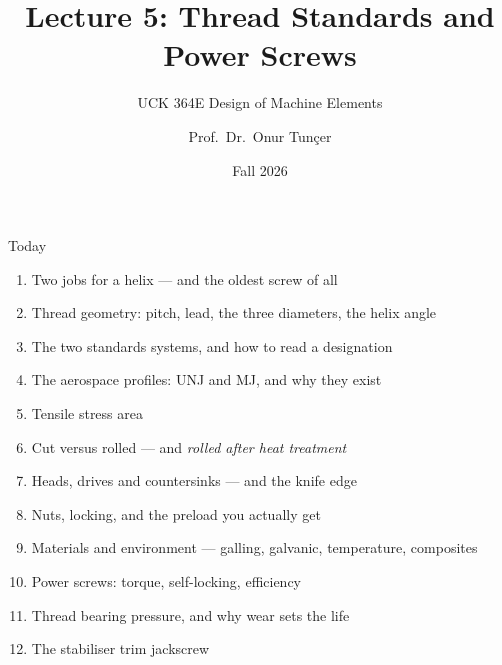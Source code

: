 \documentclass[aspectratio=169,10pt]{beamer}
\title{Lecture 5: Thread Standards and Power Screws}
\subtitle{UCK 364E Design of Machine Elements}
\author{Prof.\ Dr.\ Onur Tunçer}
\institute{Department of Aeronautical Engineering, Istanbul Technical University}
\date{Fall 2026}
\begin{document}
\maketitle

\begin{frame}{Today}
\begin{enumerate}
  \item Two jobs for a helix --- and the oldest screw of all
  \item Thread geometry: pitch, lead, the three diameters, the helix angle
  \item The two standards systems, and how to read a designation
  \item The aerospace profiles: UNJ and MJ, and why they exist
  \item Tensile stress area
  \item Cut versus rolled --- and \emph{rolled after heat treatment}
  \item Heads, drives and countersinks --- and the knife edge
  \item Nuts, locking, and the preload you actually get
  \item Materials and environment --- galling, galvanic, temperature, composites
  \item Power screws: torque, self-locking, efficiency
  \item Thread bearing pressure, and why wear sets the life
  \item The stabiliser trim jackscrew
\end{enumerate}
\end{frame}
\end{document}
